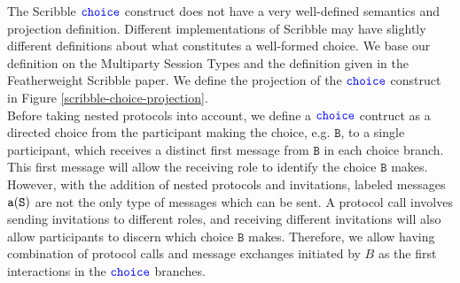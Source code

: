 \documentclass[12pt,twoside]{report}
\begin{document}


 


The Scribble ${\color{blue}\mathtt{choice}}$ construct does not have a very well-defined semantics and projection definition. Different implementations of Scribble may have slightly different definitions about what constitutes a well-formed choice.  We base our definition on the Multiparty Session Types\cite{gentleintrotompst} and the definition given in the Featherweight Scribble paper\cite{featherweight}. We define the projection of the ${\color{blue}\mathtt{choice}}$ construct in Figure \ref{scribble-choice-projection}.\\


Before taking nested protocols into account, we define a ${\color{blue}\mathtt{choice}}$ contruct as a directed choice from the participant making the choice, e.g. $\mathtt{B}$, to a single participant, which receives a distinct first message from $\mathtt{B}$ in each choice branch. This first message will allow the receiving role to identify the choice $\mathtt{B}$ makes. However, with the addition of nested protocols and invitations, labeled messages $\mathtt{a}(\mathtt{S})$ are not the only type of messages which can be sent. A protocol call involves sending invitations to different roles, and receiving different invitations will also allow participants to discern which choice $\mathtt{B}$ makes. Therefore, we allow having combination of protocol calls and message exchanges initiated by $B$ as the first interactions in the ${\color{blue}\mathtt{choice}}$ branches.\\
\end{document}
